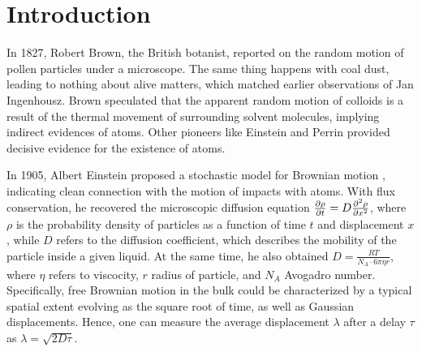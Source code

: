 \documentclass[fleqn,10pt]{InternshipReport-ENS-PSL}
\begin{document}
\flushbottom %

\maketitle %

\thispagestyle{empty} %



\section*{Introduction} %
 
In 1827, Robert Brown, the British botanist, reported on the random motion of pollen particles under a microscope. \cite{Brown1} The same thing happens with coal dust, leading to nothing about alive matters, which matched earlier observations of Jan Ingenhousz. Brown speculated that the apparent random motion of colloids is a result of the thermal movement of surrounding solvent molecules, implying indirect evidences of atoms. %
Other pioneers like Einstein and Perrin provided decisive evidence for the existence of atoms. 

In 1905, Albert Einstein proposed a stochastic model for Brownian motion \cite{Einstein1905}, indicating clean connection with the motion of impacts with atoms. With flux conservation, he recovered the microscopic diffusion equation $\pder[\rho]{t} = D \pdv[2]{\rho}{x}$, where $\rho$ is the probability density of particles as a function of time $t$ and displacement $x$, while $D$ refers to the diffusion coefficient, which describes the mobility of the particle inside a given liquid. 
At the same time, he also obtained $D = \frac{RT}{N_A \cdot 6\pi \eta r}$, where $\eta$ refers to viscocity, $r$ radius of particle, and $N_A$ Avogadro number. 
Specifically, free Brownian motion in the bulk could be characterized by a typical spatial extent evolving as the square root of time, as well as Gaussian displacements. Hence, one can measure the average displacement $\lambda$ after a delay $\tau$ as $\lambda = \sqrt{2D \tau}$. 
\end{document}
